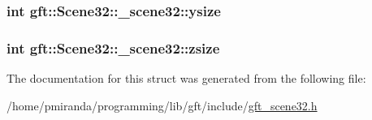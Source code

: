 \subsubsection[{\texorpdfstring{ysize}{ysize}}]{\setlength{\rightskip}{0pt plus 5cm}int gft\+::\+Scene32\+::\+\_\+scene32\+::ysize}\hypertarget{structgft_1_1Scene32_1_1__scene32_aa77d48ddba1f5845e63aa4f14d78aeaa}{}\label{structgft_1_1Scene32_1_1__scene32_aa77d48ddba1f5845e63aa4f14d78aeaa}
\subsubsection[{\texorpdfstring{zsize}{zsize}}]{\setlength{\rightskip}{0pt plus 5cm}int gft\+::\+Scene32\+::\+\_\+scene32\+::zsize}\hypertarget{structgft_1_1Scene32_1_1__scene32_af18d678198189cc926207beba928dedd}{}\label{structgft_1_1Scene32_1_1__scene32_af18d678198189cc926207beba928dedd}


The documentation for this struct was generated from the following file\+:\begin{DoxyCompactItemize}
\item 
/home/pmiranda/programming/lib/gft/include/\hyperlink{gft__scene32_8h}{gft\+\_\+scene32.\+h}\end{DoxyCompactItemize}
